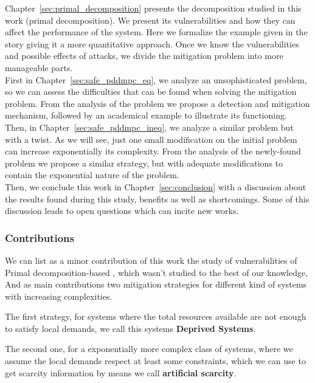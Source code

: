 \documentclass[../main.tex]{subfiles}
\begin{document}
Chapter~\ref{sec:primal_decomposition} presents the decomposition studied in this work (primal decomposition). We present its vulnerabilities and how they can affect the performance of the system. Here we formalize the example given in the story giving it a more quantitative approach.
Once we know the vulnerabilities and possible effects of attacks, we divide the mitigation problem into more manageable parts.
\\ First in Chapter~\ref{sec:safe_pddmpc_eq}, we analyze an unsophisticated problem, so we can assess the difficulties that can be found when solving the mitigation problem. From the analysis of the problem we propose a detection and mitigation mechanism, followed by an academical example to illustrate its functioning.
\\Then, in Chapter~\ref{sec:safe_pddmpc_ineq}, we analyze a similar problem but with a twist. As we will see, just one small modification on the initial problem can increase exponentially its complexity.
From the analysis of the newly-found problem we propose a similar strategy, but with adequate modifications to contain the exponential nature of the problem.
\\Then, we conclude this work in Chapter~\ref{sec:conclusion} with a discussion about the results found during this study, benefits as well as shortcomings. Some of this discussion leads to open questions which can incite new works.

\subsubsection{Contributions}
We can list as a minor contribution of this work the study of vulnerabilities of Primal decomposition-based \dmpc{}, which wasn't studied to the best of our knowledge,
And as main contributions two mitigation strategies for different kind of systems with increasing complexities.

The first strategy, for systems where the total resources available are not enough to satisfy local demands, we call this systems \textbf{Deprived Systems}.

The second one, for a exponentially more complex class of systems, where we assume the local demands respect at least some constraints, which we can use to get scarcity information by means we call \textbf{artificial scarcity}.
\end{document}
